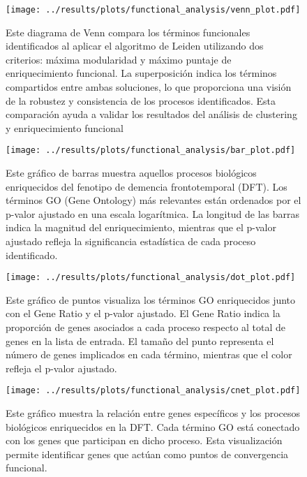 \begin{figure}[htbp]
	\centering
	\texttt{[image: ../results/plots/functional\_analysis/venn\_plot.pdf]}
	\caption{Este diagrama de Venn compara los términos funcionales identificados al aplicar el algoritmo de Leiden utilizando dos criterios: máxima modularidad y máximo puntaje de enriquecimiento funcional. La superposición indica los términos compartidos entre ambas soluciones, lo que proporciona una visión de la robustez y consistencia de los procesos identificados. Esta comparación ayuda a validar los resultados del análisis de clustering y enriquecimiento funcional​}
	\label{fig:venn_plot}
\end{figure}


\begin{figure}[htbp]
	\centering
	\texttt{[image: ../results/plots/functional\_analysis/bar\_plot.pdf]}
	\caption{Este gráfico de barras muestra aquellos procesos biológicos enriquecidos del fenotipo de demencia frontotemporal (DFT). Los términos GO (Gene Ontology) más relevantes están ordenados por el p-valor ajustado en una escala logarítmica. La longitud de las barras indica la magnitud del enriquecimiento, mientras que el p-valor ajustado refleja la significancia estadística de cada proceso identificado​.}
	\label{fig:bar_plot}
\end{figure}

\begin{figure}[htbp]
	\centering
	\texttt{[image: ../results/plots/functional\_analysis/dot\_plot.pdf]}
	\caption{Este gráfico de puntos visualiza los términos GO enriquecidos junto con el Gene Ratio y el p-valor ajustado. El Gene Ratio indica la proporción de genes asociados a cada proceso respecto al total de genes en la lista de entrada. El tamaño del punto representa el número de genes implicados en cada término, mientras que el color refleja el p-valor ajustado.}
	\label{fig:dot_plot}
\end{figure}

\begin{figure}[htbp]
	\centering
	\texttt{[image: ../results/plots/functional\_analysis/cnet\_plot.pdf]}
	\caption{Este gráfico muestra la relación entre genes específicos y los procesos biológicos enriquecidos en la DFT. Cada término GO está conectado con los genes que participan en dicho proceso. Esta visualización permite identificar genes que actúan como puntos de convergencia funcional.}
	\label{fig:cnet_plot}
\end{figure}

